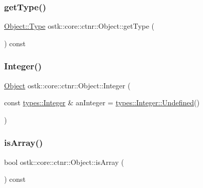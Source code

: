 \mbox{\label{classostk_1_1core_1_1ctnr_1_1_object_a9fb0c338e82078acabfd1313b8a0f509}} 
\subsubsection{\texorpdfstring{get\+Type()}{getType()}}
{\footnotesize\ttfamily \hyperlink{classostk_1_1core_1_1ctnr_1_1_object_a49b70d4dce2d24126cd1df9aaf04d1ea}{Object\+::\+Type} ostk\+::core\+::ctnr\+::\+Object\+::get\+Type (\begin{DoxyParamCaption}{ }\end{DoxyParamCaption}) const}

\mbox{\label{classostk_1_1core_1_1ctnr_1_1_object_af3bef3ae331e8e55662bf91a4cd5026f}} 
\subsubsection{\texorpdfstring{Integer()}{Integer()}}
{\footnotesize\ttfamily \hyperlink{classostk_1_1core_1_1ctnr_1_1_object}{Object} ostk\+::core\+::ctnr\+::\+Object\+::\+Integer (\begin{DoxyParamCaption}\item[{const \hyperlink{classostk_1_1core_1_1types_1_1_integer}{types\+::\+Integer} \&}]{an\+Integer = {\ttfamily \hyperlink{classostk_1_1core_1_1types_1_1_integer_a389855c42819131d631ce512f0fc6947}{types\+::\+Integer\+::\+Undefined}()} }\end{DoxyParamCaption})\hspace{0.3cm}{\ttfamily [static]}}

\mbox{\label{classostk_1_1core_1_1ctnr_1_1_object_ace057022bfd16452cec0e21fe790295a}} 
\subsubsection{\texorpdfstring{is\+Array()}{isArray()}}
{\footnotesize\ttfamily bool ostk\+::core\+::ctnr\+::\+Object\+::is\+Array (\begin{DoxyParamCaption}{ }\end{DoxyParamCaption}) const}

